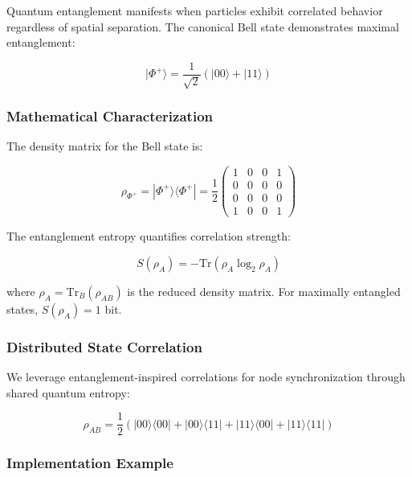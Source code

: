 \documentclass[11pt,a4paper]{article}
\newcommand{\qket}[1]{|#1\rangle}
\newcommand{\qbra}[1]{\langle#1|}
\begin{document}
Quantum entanglement manifests when particles exhibit correlated behavior regardless of spatial separation. The canonical Bell state demonstrates maximal entanglement:

\begin{equation}
\qket{\Phi^+} = \frac{1}{\sqrt{2}}(\qket{00} + \qket{11})
\label{eq:bell-state}
\end{equation}

\subsubsection{Mathematical Characterization}

The density matrix for the Bell state is:

\begin{equation}
\rho_{\Phi^+} = \qket{\Phi^+}\qbra{\Phi^+} = \frac{1}{2}\begin{pmatrix}
1 & 0 & 0 & 1 \\
0 & 0 & 0 & 0 \\
0 & 0 & 0 & 0 \\
1 & 0 & 0 & 1
\end{pmatrix}
\end{equation}

The entanglement entropy quantifies correlation strength:

\begin{equation}
S(\rho_A) = -\text{Tr}(\rho_A \log_2 \rho_A)
\label{eq:entanglement-entropy}
\end{equation}

where $\rho_A = \text{Tr}_B(\rho_{AB})$ is the reduced density matrix. For maximally entangled states, $S(\rho_A) = 1$ bit.

\subsubsection{Distributed State Correlation}

We leverage entanglement-inspired correlations for node synchronization through shared quantum entropy:

\begin{equation}
\rho_{AB} = \frac{1}{2}(\qket{00}\qbra{00} + \qket{00}\qbra{11} + \qket{11}\qbra{00} + \qket{11}\qbra{11})
\end{equation}

\subsubsection{Implementation Example}
\end{document}
